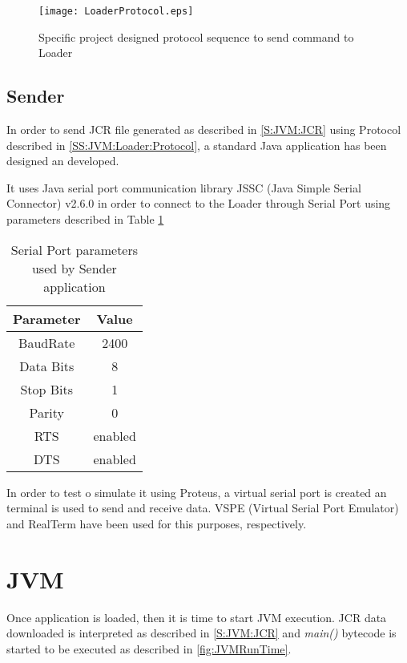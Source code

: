 \begin{figure}[H]
\centering
\texttt{[image: LoaderProtocol.eps]}
\caption{Specific project designed protocol sequence to send command to Loader}
\label{fig:SS:JVM:Loader:ProtocolSeq}
\end{figure}

\subsection{Sender}\label{SS:JVM:Loader:Sender}
In order to send JCR file generated as described in \ref{S:JVM:JCR} using Protocol described in \ref{SS:JVM:Loader:Protocol}, a standard Java application has been designed an developed.

It uses Java serial port communication library JSSC (Java Simple Serial Connector) v2.6.0 in order to connect to the Loader through Serial Port using parameters described in Table \ref{tab:SS:JVM:Loader:Sender:Params}

\begin{table}[!htb]
\centering
\begin{tabular}{|c|c|}
\hline 
Parameter & Value \\ 
\hline 
BaudRate & 2400 \\ 
\hline 
Data Bits & 8 \\ 
\hline 
Stop Bits & 1 \\ 
\hline 
Parity & 0 \\ 
\hline 
RTS & enabled \\ 
\hline 
DTS & enabled \\ 
\hline 
\end{tabular}
\caption{Serial Port parameters used by Sender application}
\label{tab:SS:JVM:Loader:Sender:Params}
\end{table}

In order to test o simulate it using Proteus, a virtual serial port is created an terminal is used to send and receive data. VSPE (Virtual Serial Port Emulator)  and RealTerm have been used for this purposes, respectively.

\section{JVM}\label{S:JVM:RunTime}
Once application is loaded, then it is time to start JVM execution. JCR data downloaded is interpreted as described in \ref{S:JVM:JCR} and \textit{main()} bytecode is started to be executed as described in \ref{fig:JVMRunTime}.

